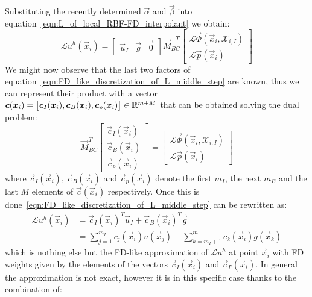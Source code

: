 \medskip
Substituting the recently determined $\vec{\alpha}$ and $\vec{\beta}$ into equation~\eqref{eqn:L_of_local_RBF-FD_interpolant} we obtain:
\begin{equation}
	\label{eqn:FD_like_discretization_of_L_middle_step}
	\mathcal{L} u^h(\vec{x}_i) = 
	\begin{bmatrix}
		\vec{u}_I  &  \vec{g}  &  \vec{0}
	\end{bmatrix}
	\vec{M}_{BC}^{-T}
	\begin{bmatrix}
		\mathcal{L} \vec{\Phi}(\vec{x}_i, \mathcal{X}_{i,I})  \\
		\mathcal{L} \vec{p}(\vec{x}_i)
	\end{bmatrix}	
\end{equation}
We might now observe that the last two factors of equation~\eqref{eqn:FD_like_discretization_of_L_middle_step} are known, thus we can represent their product with a vector $\boldsymbol{c}(\boldsymbol{x}_i) = \bigl[ \boldsymbol{c}_I(\boldsymbol{x}_i), \boldsymbol{c}_B(\boldsymbol{x}_i), \boldsymbol{c}_p(\boldsymbol{x}_i) \bigr] \in \mathbb{R}^{m+M}$ that can be obtained solving the dual problem:
\begin{equation}
\label{eqn:row_of_C_system}
	\vec{M}_{BC}^T
	\begin{bmatrix}
		\vec{c}_I(\vec{x}_i)  \\
		\vec{c}_B(\vec{x}_i)  \\
		\vec{c}_p(\vec{x}_i)
   \end{bmatrix} = 
	\begin{bmatrix}
		\mathcal{L} \vec{\Phi}(\vec{x}_i, \mathcal{X}_{i,I})  \\
		\mathcal{L} \vec{p}(\vec{x}_i)
	\end{bmatrix}
\end{equation}
where $\vec{c}_I(\vec{x}_i)$, $\vec{c}_B(\vec{x}_i)$ and $\vec{c}_p(\vec{x}_i)$ denote the first $m_I$, the next $m_B$ and the last $M$ elements of $\vec{c}(\vec{x}_i)$ respectively.
Once this is done~\eqref{eqn:FD_like_discretization_of_L_middle_step} can be rewritten as:
\begin{equation}
	\begin{aligned}
		\mathcal{L} u^h(\vec{x}_i) & = \vec{c}_I(\vec{x}_i)^T \vec{u}_I + \vec{c}_B(\vec{x}_i)^T \vec{g}  \\[2ex]
								   & = \sum_{j=1}^{m_I} c_j(\vec{x}_i) u(\vec{x}_j) + \sum_{k=m_I+1}^{m} c_k(\vec{x}_i)g(\vec{x}_k)
	\end{aligned}
\end{equation}
which is nothing else but the FD-like approximation of $\mathcal{L}u^h$ at point $\vec{x}_i$ with FD weights given by the elements of the vectors $\vec{c}_I(\vec{x}_i)$ and $\vec{c}_P(\vec{x}_i)$. In general the approximation is not exact, however it is in this specific case thanks to the combination of:
